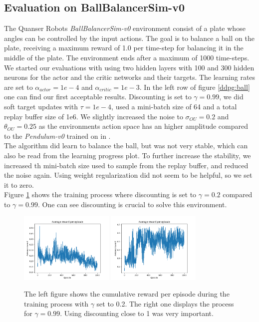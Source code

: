 \subsection{Evaluation on BallBalancerSim-v0}
The Quanser Robots \textit{BallBalancerSim-v0} environment consist of a plate whose angles can be controlled by the input actions. The goal is to balance a ball on the plate, receiving a maximum reward of 1.0 per time-step for balancing it in the middle of the plate. The environment ends after a maximum of 1000 time-steps.\\
We started our evaluations with using two hidden layers with 100 and 300 hidden neurons for the actor and the critic networks and their targets. The learning rates are set to $\alpha_{actor}=1e-4$ and $\alpha_{critic}=1e-3$. 
In the left row of figure \ref{ddpg:ball} one can find our first acceptable results. Discounting is set to $\gamma=0.99$, we did soft target updates with $\tau=1e-4$, used a mini-batch size of 64 and a total replay buffer size of 1e6. We slightly increased the noise to $\sigma_{OU}=0.2$ and $\theta_{OU}=0.25$ as the environments action space has an higher amplitude compared to the \textit{Pendulum-v0} trained on in \citep{lillicrap2015continuous}.\\
The algorithm did learn to balance the ball, but was not very stable, which can also be read from the learning progress plot. To further increase the stability, we increased th mini-batch size used to sample from the replay buffer, and reduced the noise again. Using weight regularization did not seem to be helpful, so we set it to zero.\\
Figure \ref{ddpg:ball:gamma} shows the training process where discounting is set to $\gamma=0.2$ compared to $\gamma=0.99$. One can see discounting is crucial to solve this environment.\\
\begin{figure}
	\centering
	\includegraphics[width=0.4\textwidth]{plots/ddpg_ball_low_gamma.png}
	\includegraphics[width=0.4\textwidth]{plots/ddpg_ball_high_gamma.png}
	\caption{The left figure shows the cumulative reward per episode during the training process with $\gamma$ set to 0.2. The right one displays the process for $\gamma=0.99$. Using discounting close to 1 was very important.}
	\label{ddpg:ball:gamma}
\end{figure}
